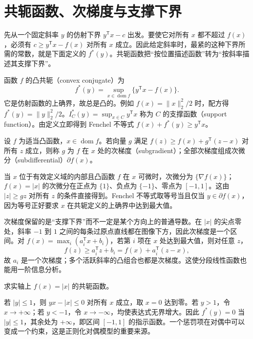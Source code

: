 \documentclass[UTF8,12pt,a4paper,fontset=fandol]{ctexbook}
\begin{document}
\section{共轭函数、次梯度与支撑下界}

先从一个固定斜率 $y$ 的仿射下界 $y^{\mathsf T}x-c$ 出发。要使它对所有 $x$ 都不超过 $f(x)$，必须有 $c\geq y^{\mathsf T}x-f(x)$ 对所有 $x$ 成立。因此给定斜率时，最紧的这种下界所需的常数，就是下面定义的 $f^*(y)$。共轭函数把“按位置描述函数”转为“按斜率描述其支撑下界”。

函数 $f$ 的凸共轭（convex conjugate）为
\begin{equation}
 f^*(y)=\sup_{x\in\operatorname{dom}f}\{y^{\mathsf T}x-f(x)\}.
 \label{eq:co-conjugate}
\end{equation}
它是仿射函数的上确界，故总是凸的。例如 $f(x)=\|x\|_2^2/2$ 时，配方得 $f^*(y)=\|y\|_2^2/2$。$I_C^*(y)=\sup_{x\in C}y^{\mathsf T}x$ 称为 $C$ 的支撑函数（support function）。由定义立即得到 Fenchel 不等式 $f(x)+f^*(y)\geq y^{\mathsf T}x$。

\begin{definition}
设 $f$ 为适当凸函数，$x\in\operatorname{dom}f$。若向量 $g$ 满足 $f(z)\geq f(x)+g^{\mathsf T}(z-x)$ 对所有 $z$ 成立，则称 $g$ 为 $f$ 在 $x$ 处的次梯度（subgradient）；全部次梯度组成次微分（subdifferential）$\partial f(x)$。
\end{definition}

当 $x$ 位于有效定义域的内部且凸函数 $f$ 在 $x$ 可微时，次微分为 $\{\nabla f(x)\}$；$f(x)=|x|$ 的次微分在正点为 $\{1\}$、负点为 $\{-1\}$、零点为 $[-1,1]$。这由 $|z|\geq gz$ 对所有 $z$ 的条件直接得到。Fenchel 不等式取等号当且仅当 $y\in\partial f(x)$，因为等号正好要求 $x$ 在共轭定义的上确界中达到最大值。

次梯度保留的是“支撑下界”而不一定是某个方向上的普通导数。在 $|x|$ 的尖点零处，斜率 $-1$ 到 $1$ 之间的每条过原点直线都在图像下方，因此次梯度是一个区间。对 $f(x)=\max_i(a_i^{\mathsf T}x+b_i)$，若第 $i$ 项在 $x$ 处达到最大值，则对任意 $z$，
\[
 f(z)\geq a_i^{\mathsf T}z+b_i
 =f(x)+a_i^{\mathsf T}(z-x),
\]
故 $a_i$ 是一个次梯度；多个活跃斜率的凸组合也都是次梯度。这使分段线性函数也能用一阶信息分析。

\begin{example}[绝对值的共轭]
求实轴上 $f(x)=|x|$ 的共轭函数。
\end{example}
\begin{solve}
若 $|y|\leq1$，则 $yx-|x|\leq0$ 对所有 $x$ 成立，取 $x=0$ 达到零。若 $y>1$，令 $x\to+\infty$；若 $y<-1$，令 $x\to-\infty$，均使表达式无界增大。因此 $f^*(y)=0$ 当 $|y|\leq1$，其余处为 $+\infty$，即区间 $[-1,1]$ 的指示函数。一个惩罚项在对偶中可以变成一个约束，这是正则化对偶模型的重要来源。
\end{solve}
\end{document}
